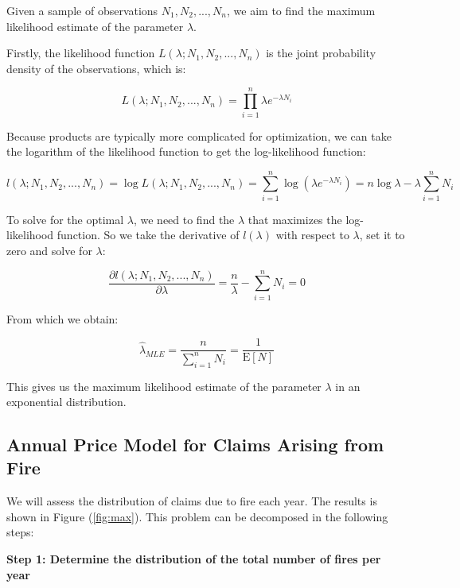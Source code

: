 \documentclass[12pt]{article}  %
\begin{document}
Given a sample of observations $N_1, N_2, ..., N_n$, we aim to find the maximum likelihood estimate of the parameter $\lambda$.

Firstly, the likelihood function $L(\lambda; N_1, N_2, ..., N_n)$ is the joint probability density of the observations, which is:

\begin{equation}
L(\lambda; N_1, N_2, ..., N_n) = \prod_{i=1}^{n}\lambda e^{-\lambda N_i}
\end{equation}

Because products are typically more complicated for optimization, we can take the logarithm of the likelihood function to get the log-likelihood function:

\begin{equation}
l(\lambda; N_1, N_2, ..., N_n) = \log L(\lambda; N_1, N_2, ..., N_n) = \sum_{i=1}^{n} \log (\lambda e^{-\lambda N_i}) = n\log\lambda - \lambda \sum_{i=1}^{n} N_i
\end{equation}

To solve for the optimal $\lambda$, we need to find the $\lambda$ that maximizes the log-likelihood function. So we take the derivative of $l(\lambda)$ with respect to $\lambda$, set it to zero and solve for $\lambda$:

\begin{equation}
\frac{\partial l(\lambda; N_1, N_2, ..., N_n)}{\partial \lambda} = \frac{n}{\lambda} - \sum_{i=1}^{n} N_i = 0
\end{equation}

From which we obtain:

\begin{equation}
\hat{\lambda}_{MLE} = \frac{n}{\sum_{i=1}^{n} N_i} = \frac{1}{\text{E}[N]}
\end{equation}

This gives us the maximum likelihood estimate of the parameter $\lambda$ in an exponential distribution.

\subsection{Annual Price Model for Claims Arising from Fire}

We will assess the distribution of claims due to fire each year. The results is shown in Figure (\ref{fig:max}). This problem can be decomposed in the following steps:

\textbf{Step 1: Determine the distribution of the total number of fires per year}
\end{document}
